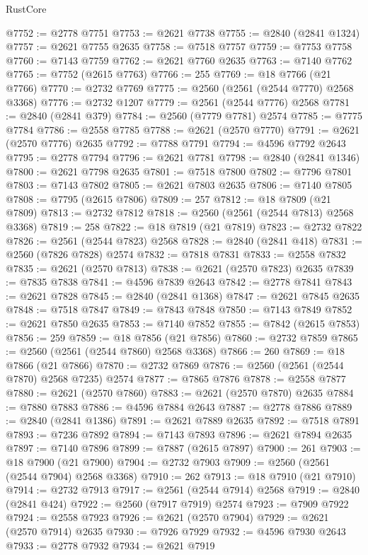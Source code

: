 \begin{lexlean}{RustCore}
\begin{coremodule}
@7752 := @2778 @7751
@7753 := @2621 @7738
@7755 := @2840 (@2841 @1324)
@7757 := @2621 @7755 @2635
@7758 := @7518 @7757
@7759 := @7753 @7758
@7760 := @7143 @7759
@7762 := @2621 @7760 @2635
@7763 := @7140 @7762
@7765 := @7752 (@2615 @7763)
@7766 := 255
@7769 := @18 @7766 (@21 @7766)
@7770 := @2732 @7769
@7775 := @2560 (@2561 (@2544 @7770) @2568 @3368)
@7776 := @2732 @1207
@7779 := @2561 (@2544 @7776) @2568
@7781 := @2840 (@2841 @379)
@7784 := @2560 (@7779 @7781) @2574
@7785 := @7775 @7784
@7786 := @2558 @7785
@7788 := @2621 (@2570 @7770)
@7791 := @2621 (@2570 @7776) @2635
@7792 := @7788 @7791
@7794 := @4596 @7792 @2643
@7795 := @2778 @7794
@7796 := @2621 @7781
@7798 := @2840 (@2841 @1346)
@7800 := @2621 @7798 @2635
@7801 := @7518 @7800
@7802 := @7796 @7801
@7803 := @7143 @7802
@7805 := @2621 @7803 @2635
@7806 := @7140 @7805
@7808 := @7795 (@2615 @7806)
@7809 := 257
@7812 := @18 @7809 (@21 @7809)
@7813 := @2732 @7812
@7818 := @2560 (@2561 (@2544 @7813) @2568 @3368)
@7819 := 258
@7822 := @18 @7819 (@21 @7819)
@7823 := @2732 @7822
@7826 := @2561 (@2544 @7823) @2568
@7828 := @2840 (@2841 @418)
@7831 := @2560 (@7826 @7828) @2574
@7832 := @7818 @7831
@7833 := @2558 @7832
@7835 := @2621 (@2570 @7813)
@7838 := @2621 (@2570 @7823) @2635
@7839 := @7835 @7838
@7841 := @4596 @7839 @2643
@7842 := @2778 @7841
@7843 := @2621 @7828
@7845 := @2840 (@2841 @1368)
@7847 := @2621 @7845 @2635
@7848 := @7518 @7847
@7849 := @7843 @7848
@7850 := @7143 @7849
@7852 := @2621 @7850 @2635
@7853 := @7140 @7852
@7855 := @7842 (@2615 @7853)
@7856 := 259
@7859 := @18 @7856 (@21 @7856)
@7860 := @2732 @7859
@7865 := @2560 (@2561 (@2544 @7860) @2568 @3368)
@7866 := 260
@7869 := @18 @7866 (@21 @7866)
@7870 := @2732 @7869
@7876 := @2560 (@2561 (@2544 @7870) @2568 @7235) @2574
@7877 := @7865 @7876
@7878 := @2558 @7877
@7880 := @2621 (@2570 @7860)
@7883 := @2621 (@2570 @7870) @2635
@7884 := @7880 @7883
@7886 := @4596 @7884 @2643
@7887 := @2778 @7886
@7889 := @2840 (@2841 @1386)
@7891 := @2621 @7889 @2635
@7892 := @7518 @7891
@7893 := @7236 @7892
@7894 := @7143 @7893
@7896 := @2621 @7894 @2635
@7897 := @7140 @7896
@7899 := @7887 (@2615 @7897)
@7900 := 261
@7903 := @18 @7900 (@21 @7900)
@7904 := @2732 @7903
@7909 := @2560 (@2561 (@2544 @7904) @2568 @3368)
@7910 := 262
@7913 := @18 @7910 (@21 @7910)
@7914 := @2732 @7913
@7917 := @2561 (@2544 @7914) @2568
@7919 := @2840 (@2841 @424)
@7922 := @2560 (@7917 @7919) @2574
@7923 := @7909 @7922
@7924 := @2558 @7923
@7926 := @2621 (@2570 @7904)
@7929 := @2621 (@2570 @7914) @2635
@7930 := @7926 @7929
@7932 := @4596 @7930 @2643
@7933 := @2778 @7932
@7934 := @2621 @7919

\end{coremodule}
\end{lexlean}
